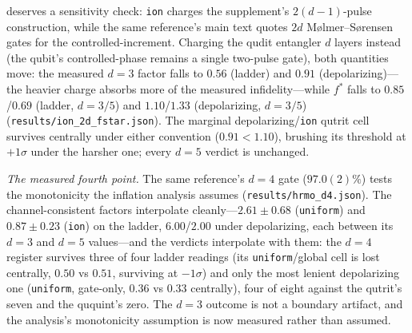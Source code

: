 \documentclass[aps,pra,reprint,superscriptaddress,nofootinbib,floatfix]{revtex4-2}
\begin{document}
deserves a sensitivity check: \texttt{ion} charges the supplement's
$2(d{-}1)$-pulse construction, while the same reference's main text
quotes $2d$ M{\o}lmer--S{\o}rensen gates for the controlled-increment.
Charging the qudit entangler $d$ layers instead (the qubit's
controlled-phase remains a single two-pulse gate), both quantities
move: the measured $d=3$ factor falls to $0.56$ (ladder) and $0.91$
(depolarizing)---the heavier charge absorbs more of the measured
infidelity---while $f^\ast$ falls to $0.85$/$0.69$ (ladder, $d=3/5$)
and $1.10$/$1.33$ (depolarizing, $d=3/5$)
(\texttt{results/ion\_2d\_fstar.json}). The marginal
depolarizing/\texttt{ion} qutrit cell survives centrally under either
convention ($0.91<1.10$), brushing its threshold at $+1\sigma$ under
the harsher one; every $d=5$ verdict is unchanged.

\emph{The measured fourth point.} The same reference's $d=4$ gate
($97.0(2)\%$) tests the monotonicity the inflation analysis assumes
(\texttt{results/hrmo\_d4.json}). The channel-consistent factors
interpolate cleanly---$2.61\pm0.68$ (\texttt{uniform}) and
$0.87\pm0.23$ (\texttt{ion}) on the ladder, $6.00$/$2.00$ under
depolarizing, each between its $d=3$ and $d=5$ values---and the
verdicts interpolate with them: the $d=4$ register survives three of
four ladder readings (its \texttt{uniform}/global cell is lost
centrally, $0.50$ vs $0.51$, surviving at $-1\sigma$) and only the
most lenient depolarizing one
(\texttt{uniform}, gate-only, $0.36$ vs $0.33$ centrally), four of
eight against the qutrit's seven and the ququint's zero. The $d=3$
outcome is not a boundary artifact, and the analysis's monotonicity
assumption is now measured rather than assumed.
\end{document}
